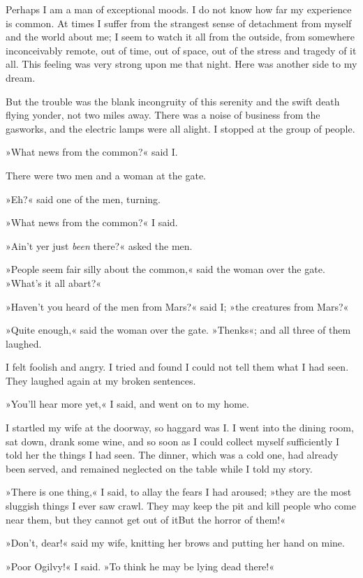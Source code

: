 Perhaps I am a man of exceptional moods. I do not know how far my experience is common. At times I suffer from the strangest sense of detachment from myself and the world about me; I seem to watch it all from the outside, from somewhere inconceivably remote, out of time, out of space, out of the stress and tragedy of it all. This feeling was very strong upon me that night. Here was another side to my dream.

But the trouble was the blank incongruity of this serenity and the swift death flying yonder, not two miles away. There was a noise of business from the gasworks, and the electric lamps were all alight. I stopped at the group of people.

»What news from the common?« said I.

There were two men and a woman at the gate.

»Eh?« said one of the men, turning.

»What news from the common?« I said.

»Ain't yer just \textit{been} there?« asked the men.

»People seem fair silly about the common,« said the woman over the gate. »What's it all abart?«

»Haven't you heard of the men from Mars?« said I; »the creatures from Mars?«

»Quite enough,« said the woman over the gate. »Thenks«; and all three of them laughed.

I felt foolish and angry. I tried and found I could not tell them what I had seen. They laughed again at my broken sentences.

»You'll hear more yet,« I said, and went on to my home.

I startled my wife at the doorway, so haggard was I. I went into the dining room, sat down, drank some wine, and so soon as I could collect myself sufficiently I told her the things I had seen. The dinner, which was a cold one, had already been served, and remained neglected on the table while I told my story.

»There is one thing,« I said, to allay the fears I had aroused; »they are the most sluggish things I ever saw crawl. They may keep the pit and kill people who come near them, but they cannot get out of it\textellipsis But the horror of them!«

»Don't, dear!« said my wife, knitting her brows and putting her hand on mine.

»Poor Ogilvy!« I said. »To think he may be lying dead there!«

